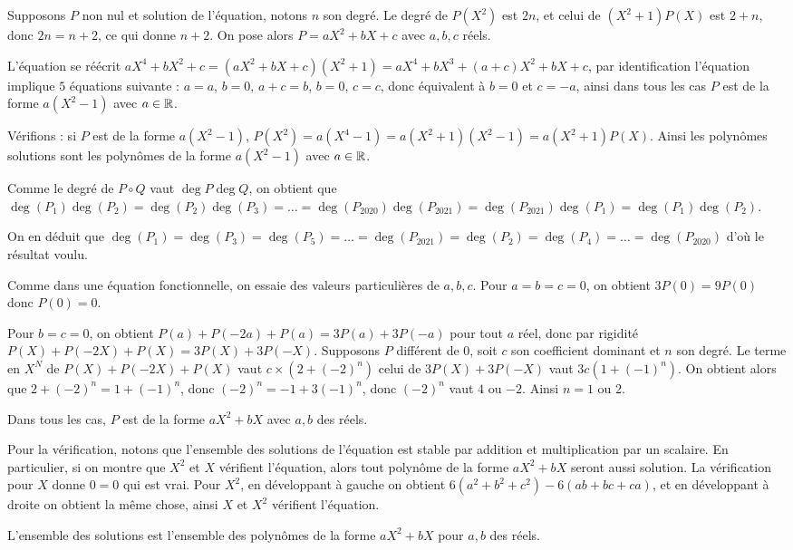 \begin{sol}
Supposons $P$ non nul et solution de l'équation, notons $n$ son degré. Le degré de $P(X^2)$ est $2n$, et celui de $(X^2 + 1)P(X)$ est $2 + n$, donc $2n = n + 2$, ce qui donne $n + 2$. On pose alors $P = aX^2 + bX + c$ avec $a, b, c$ réels.

L'équation se réécrit $aX^4 + bX^2 + c = (aX^2 + bX + c)(X^2 + 1) = aX^4 + bX^3 + (a + c)X^2 + bX + c$, par identification l'équation implique $5$ équations suivante : $a = a$, $b = 0$, $a + c = b$, $b = 0$, $c = c$, donc équivalent à $b = 0$ et $c = -a$, ainsi dans tous les cas $P$ est de la forme $a(X^2 - 1)$ avec $a\in \mathbb R$.

Vérifions : si $P$ est de la forme $a(X^2 - 1)$, $P(X^2) = a(X^4 - 1) = a(X^2 + 1)(X^2 - 1) = a(X^2 + 1)P(X)$. Ainsi les polynômes solutions sont les polynômes de la forme $a(X^2 - 1)$ avec $a\in \mathbb R$.
\end{sol}


\begin{sol}
Comme le degré de $P\circ Q$ vaut $\deg P \deg Q$, on obtient que $\deg(P_1)\deg(P_2) = \deg(P_2)\deg(P_3) = \dots = \deg(P_{2020})\deg(P_{2021}) = \deg(P_{2021})\deg(P_1) = \deg(P_1)\deg(P_2)$.

On en déduit que $\deg(P_1) = \deg(P_3) = \deg(P_5) = \dots = \deg(P_{2021}) = \deg(P_2) = \deg(P_4) = \dots = \deg(P_{2020})$ d'où le résultat voulu.
\end{sol}


\begin{sol}
Comme dans une équation fonctionnelle, on essaie des valeurs particulières de $a, b, c$. Pour $a = b = c = 0$, on obtient $3P(0) = 9P(0)$ donc $P(0) = 0$.

Pour $b = c = 0$, on obtient $P(a) + P(-2a) + P(a) = 3P(a) + 3P(-a)$ pour tout $a$ réel, donc par rigidité $P(X) + P(-2X) + P(X) = 3P(X) + 3P(-X)$. Supposons $P$ différent de $0$, soit $c$ son coefficient dominant et $n$ son degré. Le terme en $X^N$ de $P(X) + P(-2X) + P(X)$ vaut $c\times (2 + (-2)^n)$ celui de $3P(X) + 3P(-X)$ vaut $3c(1 + (-1)^n)$. On obtient alors que $2 + (-2)^n = 1 + (-1)^n$, donc $(-2)^n = -1 + 3(-1)^n$, donc $(-2)^n$ vaut $4$ ou $-2$. Ainsi $n = 1$ ou $2$.

Dans tous les cas, $P$ est de la forme $aX^2 + bX$ avec $a,b$ des réels.\smallskip

Pour la vérification, notons que l'ensemble des solutions de l'équation est stable par addition et multiplication par un scalaire. En particulier, si on montre que $X^2$ et $X$ vérifient l'équation, alors tout polynôme de la forme $aX^2 + bX$ seront aussi solution. La vérification pour $X$ donne $0 = 0$ qui est vrai. Pour $X^2$, en développant à gauche on obtient $6(a^2 + b^2 + c^2) - 6(ab + bc + ca)$, et en développant à droite on obtient la même chose, ainsi $X$ et $X^2$ vérifient l'équation.

L'ensemble des solutions est l'ensemble des polynômes de la forme $aX^2 + bX$ pour $a,b$ des réels.
\end{sol}


